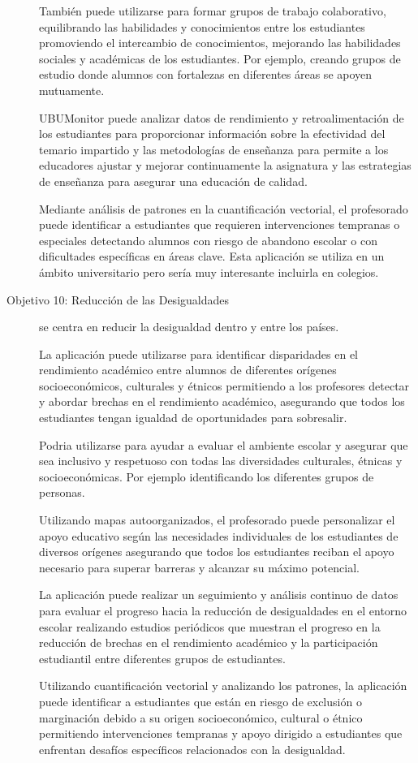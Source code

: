 \begin{description}
    También puede utilizarse para formar grupos de trabajo colaborativo, equilibrando las habilidades y conocimientos entre los estudiantes promoviendo el intercambio de conocimientos, mejorando las habilidades sociales y académicas de los estudiantes. Por ejemplo, creando grupos de estudio donde alumnos con fortalezas en diferentes áreas se apoyen mutuamente.

    UBUMonitor puede analizar datos de rendimiento y retroalimentación de los estudiantes para proporcionar información sobre la efectividad del temario impartido y las metodologías de enseñanza para permite a los educadores ajustar y mejorar continuamente la asignatura y las estrategias de enseñanza para asegurar una educación de calidad.

    Mediante análisis de patrones en la cuantificación vectorial, el profesorado puede identificar a estudiantes que requieren intervenciones tempranas o especiales detectando alumnos con riesgo de abandono escolar o con dificultades específicas en áreas clave. Esta aplicación se utiliza en un ámbito universitario pero sería muy interesante incluirla en colegios.
    
    
    \item[Objetivo 10: Reducción de las Desigualdades] se centra en reducir la desigualdad dentro y entre los países.

    La aplicación puede utilizarse para identificar disparidades en el rendimiento académico entre alumnos de diferentes orígenes socioeconómicos, culturales y étnicos permitiendo a los profesores detectar y abordar brechas en el rendimiento académico, asegurando que todos los estudiantes tengan igualdad de oportunidades para sobresalir.

    Podria utilizarse para ayudar a evaluar el ambiente escolar y asegurar que sea inclusivo y respetuoso con todas las diversidades culturales, étnicas y socioeconómicas. Por ejemplo identificando los diferentes grupos de personas.

    Utilizando mapas autoorganizados, el profesorado puede personalizar el apoyo educativo según las necesidades individuales de los estudiantes de diversos orígenes asegurando que todos los estudiantes reciban el apoyo necesario para superar barreras y alcanzar su máximo potencial.

    La aplicación puede realizar un seguimiento y análisis continuo de datos para evaluar el progreso hacia la reducción de desigualdades en el entorno escolar realizando estudios periódicos que muestran el progreso en la reducción de brechas en el rendimiento académico y la participación estudiantil entre diferentes grupos de estudiantes.

    Utilizando cuantificación vectorial y analizando los patrones, la aplicación puede identificar a estudiantes que están en riesgo de exclusión o marginación debido a su origen socioeconómico, cultural o étnico permitiendo intervenciones tempranas y apoyo dirigido a estudiantes que enfrentan desafíos específicos relacionados con la desigualdad.
    
\end{description}
    
